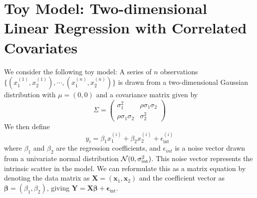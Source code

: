 \section{Toy Model: Two-dimensional Linear Regression with Correlated Covariates} \label{sec:toy_model}
We consider the following toy model: A series of $n$ observations $\{(x_1^{(1)}, x_2^{(1)}), \cdots, (x_1^{(n)}, x_2^{(n)})\}$ is drawn from a two-dimensional Gaussian distribution with $\mu=(0, 0)$ and a covariance matrix given by
\begin{equation}
    \Sigma = \left(
    \begin{matrix}
        \sigma_1^2 & \rho\sigma_1\sigma_2\\
        \rho\sigma_1\sigma_2 & \sigma_2^2
    \end{matrix}
    \right)
\end{equation}
We then define
\begin{equation}
    y_i=\beta_1 x_1^{(i)} + \beta_2 x_2^{(i)} + \epsilon_{\text{int}}^{(i)}
\label{eqn:linear_model}
\end{equation}
where $\beta_1$ and $\beta_2$ are the regression coefficients, and $\epsilon_{int}$ is a noise vector drawn from a univariate normal distribution $\mathcal{N}(0, \sigma_{\text{int}}^2)$. This noise vector represents the intrinsic scatter in the model. We can reformulate this as a matrix equation by denoting the data matrix as $\bm{X} = (\bm{x}_1, \bm{x}_2)$ and the coefficient vector as $\bm{\beta}=(\beta_1, \beta_2)$, giving $\bm{Y}=\bm{X\beta}+\bm{\epsilon}_\text{int}$.



